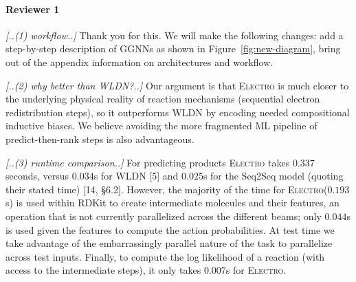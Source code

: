 \documentclass{article}
\newcommand{\ourModel}{\textsc{Electro}\xspace}
\begin{document}
\vspace{-5pt}
\paragraph{Reviewer 1}

\emph{[..(1) workflow..]}
Thank you for this. We will make the following changes: add a step-by-step description of GGNNs as shown in Figure~\ref{fig:new-diagram}, bring out of the appendix information on architectures and workflow. 

\emph{[..(2) why better than WLDN?..]}
Our argument is that \ourModel is much closer to the underlying physical reality of reaction mechanisms (sequential electron redistribution steps), so it outperforms WLDN by encoding needed compositional inductive biases. 
We believe avoiding the more fragmented ML pipeline of predict-then-rank steps is also advantageous.  %


\emph{[..(3) runtime comparison..]}
For predicting products %
\ourModel takes $0.337$ seconds, versus $0.034$s for WLDN [5] and $0.025$s %
for the Seq2Seq model (quoting their stated time) [14, \S6.2]. 
 However, the majority of the time for \ourModel ($0.193$s) is used within RDKit to create intermediate molecules and their features, an operation that is not currently parallelized across the different beams; only $0.044$s is used given the features to compute the action probabilities.
  At test time we take advantage of the embarrassingly parallel nature of the task to parallelize across test inputs. 
   Finally, to compute the log likelihood of a reaction (with access to the intermediate steps), it only takes $0.007$s for \ourModel. %
\end{document}

